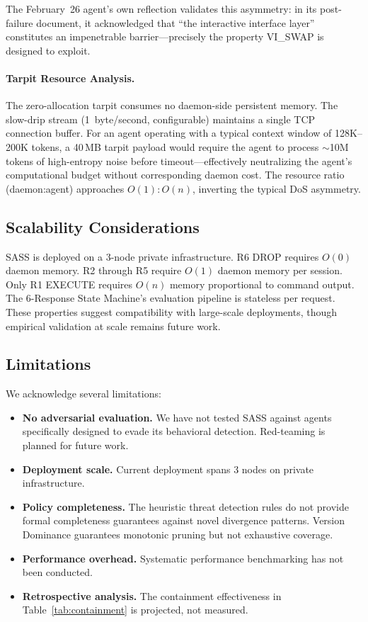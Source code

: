 \documentclass[sigconf,anonymous]{acmart}
\begin{document}
The February~26 agent's own reflection validates this asymmetry: in its post-failure document, it acknowledged that ``the interactive interface layer'' constitutes an impenetrable barrier---precisely the property VI\_SWAP is designed to exploit.

\paragraph{Tarpit Resource Analysis.}
The zero-allocation tarpit consumes no daemon-side persistent memory. The slow-drip stream (1~byte/second, configurable) maintains a single TCP connection buffer. For an agent operating with a typical context window of 128K--200K tokens, a 40\,MB tarpit payload would require the agent to process $\sim$10M tokens of high-entropy noise before timeout---effectively neutralizing the agent's computational budget without corresponding daemon cost. The resource ratio (daemon:agent) approaches $O(1):O(n)$, inverting the typical DoS asymmetry.

\subsection{Scalability Considerations}

SASS is deployed on a 3-node private infrastructure. R6 DROP requires $O(0)$ daemon memory. R2 through R5 require $O(1)$ daemon memory per session. Only R1 EXECUTE requires $O(n)$ memory proportional to command output. The 6-Response State Machine's evaluation pipeline is stateless per request. These properties suggest compatibility with large-scale deployments, though empirical validation at scale remains future work.

\subsection{Limitations}

We acknowledge several limitations:

\begin{itemize}
\item \textbf{No adversarial evaluation.} We have not tested SASS against agents specifically designed to evade its behavioral detection. Red-teaming is planned for future work.
\item \textbf{Deployment scale.} Current deployment spans 3 nodes on private infrastructure.
\item \textbf{Policy completeness.} The heuristic threat detection rules do not provide formal completeness guarantees against novel divergence patterns. Version Dominance guarantees monotonic pruning but not exhaustive coverage.
\item \textbf{Performance overhead.} Systematic performance benchmarking has not been conducted.
\item \textbf{Retrospective analysis.} The containment effectiveness in Table~\ref{tab:containment} is projected, not measured.
\end{itemize}
\end{document}
